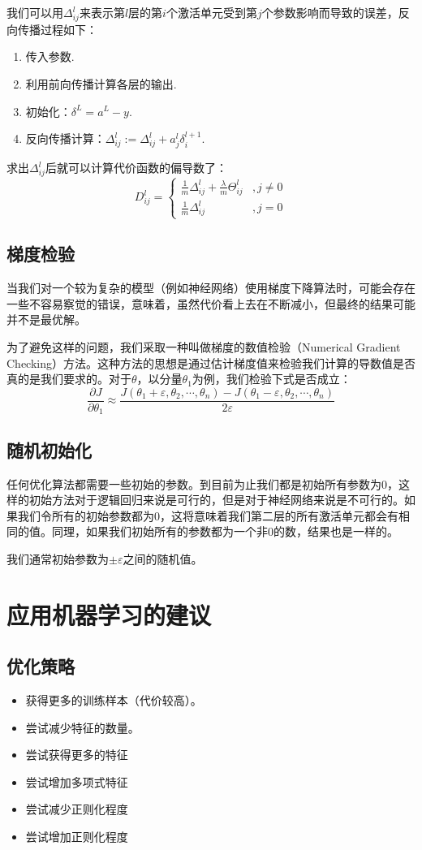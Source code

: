 \documentclass[cn,hazy,blue,normal,14pt]{elegantnote}
\begin{document}
我们可以用$\Delta_{ij}^l$来表示第$l$层的第$i$个激活单元受到第$j$个参数影响而导致的误差，反向传播过程如下：
\begin{enumerate}
    \item 传入参数.
    \item 利用前向传播计算各层的输出.
    \item 初始化：$\delta^L=a^L-y$.
    \item 反向传播计算：$\Delta_{ij}^l:=\Delta_{ij}^l+a_j^l\delta_i^{l+1}$.
\end{enumerate}

求出$\Delta_{ij}^l$后就可以计算代价函数的偏导数了：
$$
D_{ij}^l=\begin{cases}
    \frac{1}{m}\Delta_{ij}^l+\frac{\lambda}{m}\Theta_{ij}^l &,j\neq 0 \\
    \frac{1}{m}\Delta_{ij}^l &,j=0
\end{cases}
$$
\subsection{梯度检验}
当我们对一个较为复杂的模型（例如神经网络）使用梯度下降算法时，可能会存在一些不容易察觉的错误，意味着，虽然代价看上去在不断减小，但最终的结果可能并不是最优解。

为了避免这样的问题，我们采取一种叫做梯度的数值检验（Numerical Gradient Checking）方法。这种方法的思想是通过估计梯度值来检验我们计算的导数值是否真的是我们要求的。对于$\theta$，以分量$\theta_1$为例，我们检验下式是否成立：
$$
\frac{\partial J}{\partial \theta_1}\approx \frac{J(\theta_1+\varepsilon,\theta_2,\cdots,\theta_n)-J(\theta_1-\varepsilon,\theta_2,\cdots,\theta_n)}{2\varepsilon}
$$
\subsection{随机初始化}
任何优化算法都需要一些初始的参数。到目前为止我们都是初始所有参数为0，这样的初始方法对于逻辑回归来说是可行的，但是对于神经网络来说是不可行的。如果我们令所有的初始参数都为0，这将意味着我们第二层的所有激活单元都会有相同的值。同理，如果我们初始所有的参数都为一个非0的数，结果也是一样的。

我们通常初始参数为$\pm \varepsilon$之间的随机值。
\section{应用机器学习的建议}
\subsection{优化策略}
\begin{itemize}
    \item 获得更多的训练样本（代价较高）。
    \item 尝试减少特征的数量。
    \item 尝试获得更多的特征
    \item 尝试增加多项式特征
    \item 尝试减少正则化程度
    \item 尝试增加正则化程度
\end{itemize}
\end{document}
